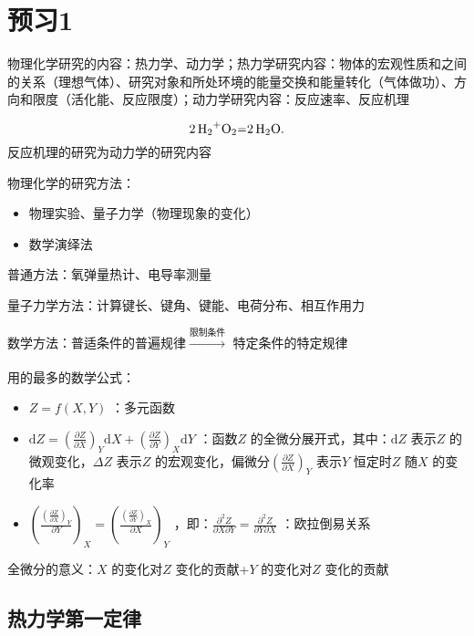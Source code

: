 \section*{预习1}%
\label{sec:预习1}
物理化学研究的内容：热力学、动力学；热力学研究内容：物体的宏观性质和之间的关系（理想气体）、研究对象和所处环境的能量交换和能量转化（气体做功）、方向和限度（活化能、反应限度）；动力学研究内容：反应速率、反应机理
\begin{eg}
    \[
        \ce{2H_2+O_2=2H_2O} 
    .\]
    反应机理的研究为动力学的研究内容
\end{eg}
物理化学的研究方法：
\begin{itemize}
    \item 物理实验、量子力学（物理现象的变化）
    \item 数学演绎法
    
\end{itemize}
\begin{eg}
    普通方法：氧弹量热计、电导率测量

    量子力学方法：计算键长、键角、键能、电荷分布、相互作用力

    数学方法：普适条件的普遍规律$\xrightarrow[]{\text{限制条件}}$ 特定条件的特定规律
\end{eg}
用的最多的数学公式：
\begin{itemize}
    \item $Z=f\left( X,Y \right)$ ：多元函数
    \item $\mathrm{d}Z=\left(\frac{\partial Z}{\partial X}\right)_{Y}\mathrm{d}X+\left(\frac{\partial Z}{\partial Y}\right)_{X}\mathrm{d}Y$ ：函数$Z$ 的全微分展开式，其中：$\mathrm{d}Z$ 表示$Z$ 的微观变化，$\Delta Z$ 表示$Z$ 的宏观变化，偏微分$\left(\frac{\partial Z}{\partial X}\right)_{Y}$ 表示$Y$ 恒定时$Z$ 随$X$ 的变化率
    \item $\left(\frac{\left(\frac{\partial Z}{\partial X}\right)_{Y}}{\partial Y}\right)_{X} = \left(\frac{\left(\frac{\partial Z}{\partial Y}\right)_{X}}{\partial X}\right)_{Y}$ ，即：$\frac{\partial^2 Z}{\partial X\partial Y} = \frac{\partial^2 Z}{\partial Y\partial X}$ ：欧拉倒易关系
\end{itemize}
\begin{notation}
    全微分的意义：$X$ 的变化对$Z$ 变化的贡献+$Y$ 的变化对$Z$ 变化的贡献
\end{notation}
\subsection*{热力学第一定律}%
\label{sub*:热力学第一定律}
